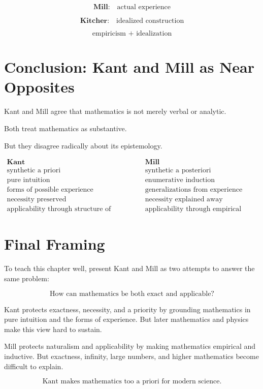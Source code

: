 \documentclass[11pt]{article}
\begin{document}
\[
\textbf{Mill:}
\quad
\text{actual experience}
\]

\[
\textbf{Kitcher:}
\quad
\text{idealized construction}
\]

\[
\text{empiricism + idealization}
\]

\section*{Conclusion: Kant and Mill as Near Opposites}

Kant and Mill agree that mathematics is not merely verbal or analytic.

Both treat mathematics as substantive.

But they disagree radically about its epistemology.

\[
\begin{array}{c|c}
\textbf{Kant} & \textbf{Mill} \\
\hline
\text{synthetic a priori} & \text{synthetic a posteriori} \\
\text{pure intuition} & \text{enumerative induction} \\
\text{forms of possible experience} & \text{generalizations from experience} \\
\text{necessity preserved} & \text{necessity explained away} \\
\text{applicability through structure of experience} &
\text{applicability through empirical origin}
\end{array}
\]

\section*{Final Framing}

To teach this chapter well, present Kant and Mill as two attempts to answer the same
problem:

\[
\boxed{
\text{How can mathematics be both exact and applicable?}
}
\]

Kant protects exactness, necessity, and a priority by grounding mathematics in pure
intuition and the forms of experience. But later mathematics and physics make this view
hard to sustain.

Mill protects naturalism and applicability by making mathematics empirical and inductive.
But exactness, infinity, large numbers, and higher mathematics become difficult to explain.

\[
\boxed{
\text{Kant makes mathematics too a priori for modern science.}
}
\]
\end{document}
